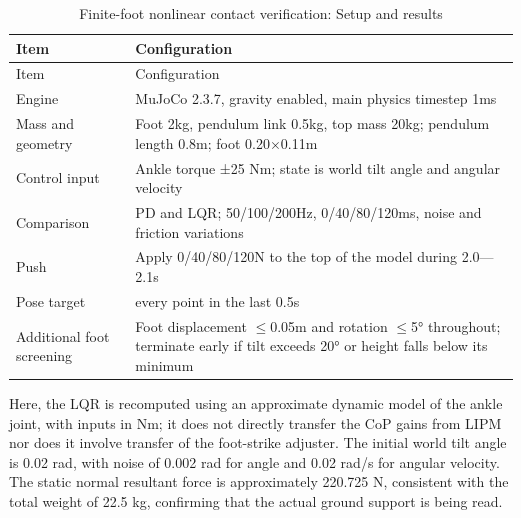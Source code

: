 \FloatBarrier\begingroup\small\setlength{\tabcolsep}{2.5pt}
\begin{longtable}[]{@{}
  >{\raggedright\arraybackslash}p{}
  >{\raggedright\arraybackslash}p{}@{}}
\caption{Finite-foot nonlinear contact verification: Setup and results}\label{tab:s19-1}\tabularnewline
\toprule\noalign{}
\begin{minipage}[b]{\linewidth}\raggedright
Item
\end{minipage} & \begin{minipage}[b]{\linewidth}\raggedright
Configuration
\end{minipage} \\
\midrule\noalign{}
\endfirsthead
\toprule\noalign{}
\begin{minipage}[b]{\linewidth}\raggedright
Item
\end{minipage} & \begin{minipage}[b]{\linewidth}\raggedright
Configuration
\end{minipage} \\
\midrule\noalign{}
\endhead
\bottomrule\noalign{}
\endlastfoot
Engine & MuJoCo 2.3.7, gravity enabled, main physics timestep 1ms \\
Mass and geometry & Foot 2kg, pendulum link 0.5kg, top mass 20kg; pendulum length 0.8m; foot 0.20\(\times\)0.11m \\
Control input & Ankle torque ±25 Nm; state is world tilt angle and angular velocity \\
Comparison & PD and LQR; 50/100/200Hz, 0/40/80/120ms, noise and friction variations \\
Push & Apply 0/40/80/120N to the top of the model during 2.0---2.1s \\
Pose target & every point in the last 0.5s \\
Additional foot screening & Foot displacement \(\leq\)0.05m and rotation \(\leq\)5° throughout; terminate early if tilt exceeds 20° or height falls below its minimum \\
\end{longtable}\endgroup

Here, the LQR is recomputed using an approximate dynamic model of the ankle joint, with inputs in Nm; it does not directly transfer the CoP gains from LIPM nor does it involve transfer of the foot-strike adjuster. The initial world tilt angle is 0.02 rad, with noise of 0.002 rad for angle and 0.02 rad/s for angular velocity. The static normal resultant force is approximately 220.725 N, consistent with the total weight of 22.5 kg, confirming that the actual ground support is being read.

